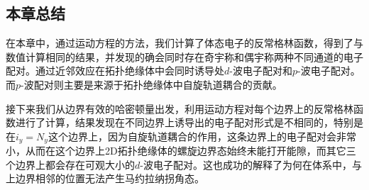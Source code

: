 \subsection{本章总结}
在本章中，通过运动方程的方法，我们计算了体态电子的反常格林函数，得到了与数值计算相同的结果，并发现的确会同时存在奇宇称和偶宇称两种不同通道的电子配对。通过近邻效应在拓扑绝缘体中会同时诱导处$d$-波电子配对和$p$-波电子配对。而$p$-波配对则主要是来源于拓扑绝缘体中自旋轨道耦合的贡献。

接下来我们从边界有效的哈密顿量出发，利用运动方程对每个边界上的反常格林函数进行了计算，结果发现在不同边界上诱导出的电子配对形式是不相同的，特别是在$i_y=N_y$这个边界上，因为自旋轨道耦合的作用，这条边界上的电子配对会非常小，从而在这个边界上2D拓扑绝缘体的螺旋边界态始终未能打开能隙，而其它三个边界上都会存在可观大小的$d$-波电子配对。这也成功的解释了为何在体系中，与上边界相邻的位置无法产生马约拉纳拐角态。












